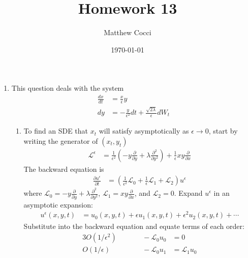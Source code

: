 \documentclass[12pt]{article}
\author{Matthew Cocci}
\title{Homework 13}
\date{\today}
\theoremstyle{plain}
\theoremstyle{definition}
\theoremstyle{remark}
\begin{document}
\maketitle



\begin{enumerate}
  \item %
    This question deals with the system
    \begin{align*}
      \frac{dx}{dt} &= \frac{x}{\epsilon}y\\
      dy &= -\frac{y}{\epsilon^2} dt + \frac{\sqrt{2\lambda}}{\epsilon} dW_t
    \end{align*}
    \begin{enumerate}
      \item %
        To find an SDE that $x_t$ will satisfy asymptotically as
        $\epsilon\rightarrow 0$, start by writing the generator of
        $(x_t,y_t)$
        \begin{align*}
          \mathscr{L}^\epsilon
          &=
          \frac{1}{\epsilon^2}
          \left(
          -y\frac{\partial}{\partial y}
          + \lambda\frac{\partial^2}{\partial y^2}
          \right)
          +
          \frac{1}{\epsilon}
          xy \frac{\partial}{\partial x}
        \end{align*}
        The backward equation is
        \begin{align*}
          \frac{\partial u^\epsilon}{\partial t}
          &= \left(
          \frac{1}{\epsilon^2} \mathscr{L}_0
          + \frac{1}{\epsilon} \mathscr{L}_1
          + \mathscr{L}_2
          \right)
          u^\epsilon
        \end{align*}
        where $\mathscr{L}_0= -y\frac{\partial}{\partial y} +
        \lambda\frac{\partial^2}{\partial y^2}$,
        $\mathscr{L}_1= xy \frac{\partial}{\partial x}$, and
        $\mathscr{L}_2=0$.
        Expand $u^\epsilon$ in an asymptotic expansion:
        \begin{align*}
          u^\epsilon(x,y,t)
          &=
          u_0(x,y,t)
          + \epsilon u_1(x,y,t)
          + \epsilon^2 u_2(x,y,t) + \cdots
        \end{align*}
        Substitute into the backward equation and equate terms of each
        order:
        \begin{alignat*}{3}
          O(1/\epsilon^2)&&\qquad -\mathscr{L}_0u_0 &= 0 \\
          O(1/\epsilon) && \qquad -\mathscr{L}_0u_1 &= \mathscr{L}_1u_0 \\

\end{alignat*}
\end{enumerate}
\end{enumerate}
\end{document}
